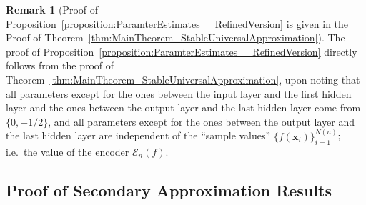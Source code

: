 \documentclass{article}
\numberwithin{equation}{section}
\theoremstyle{definition}
\newtheorem{remark}{Remark}[section]
\begin{document}
\begin{remark}[{Proof of Proposition~\ref{proposition:ParamterEstimates__RefinedVersion} is given in the Proof of Theorem~\ref{thm:MainTheorem_StableUniversalApproximation}}]
\label{remark:ParamterEstimates__RefinedVersion}
The proof of Proposition~\ref{proposition:ParamterEstimates__RefinedVersion} directly follows from the proof of Theorem~\ref{thm:MainTheorem_StableUniversalApproximation}, upon noting that all parameters except for the ones between the input layer and the first hidden layer and the ones between the output layer and the last hidden layer come from $\{0,\pm 1/2\}$, and all parameters except for the ones between the output layer and the last hidden layer are independent of the ``sample values'' $\{f(\mathbf{x}_i)\}_{i=1}^{N(n)}$; i.e.\ the value of the encoder $\mathcal{E}_n(f)$. 
\end{remark}

\subsection{{Proof of Secondary Approximation Results}}
\label{s:Proofs__ss:Secondary}
\end{document}
